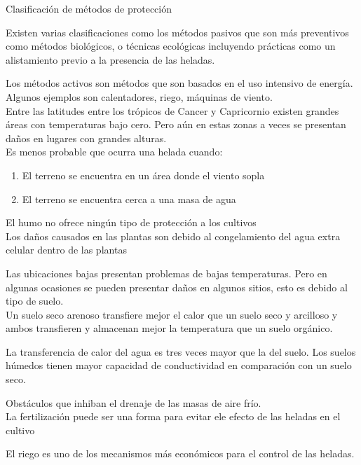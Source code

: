 \documentclass[11pt]{article}
\begin{document}
Clasificación de métodos de protección

Existen varias clasificaciones como los métodos pasivos que son más preventivos como métodos biológicos, o técnicas ecológicas incluyendo prácticas como un alistamiento previo a la presencia de las heladas.

Los métodos activos son métodos que son basados en el uso intensivo de energía. Algunos ejemplos son calentadores, riego, máquinas de viento.\\

Entre las latitudes entre los trópicos de Cancer y Capricornio existen grandes áreas con temperaturas bajo cero. Pero aún en estas zonas a veces se presentan daños en lugares con grandes alturas.\\

Es menos probable que ocurra una helada cuando:
\begin{enumerate}
\item El terreno se encuentra en un área donde el viento sopla
\item El terreno se encuentra cerca a una masa de agua
\end{enumerate}

El humo no ofrece ningún tipo de protección a los cultivos \citep{itier1987influence}\\

Los daños causados en las plantas son debido al congelamiento del agua extra celular dentro de las plantas 

Las ubicaciones bajas presentan problemas de bajas temperaturas. Pero en algunas ocasiones se pueden presentar daños en algunos sitios, esto es debido al tipo de suelo.\\

Un suelo seco arenoso transfiere mejor el calor que un suelo seco y arcilloso y ambos transfieren y almacenan mejor la temperatura que un suelo orgánico.

La transferencia de calor del agua es tres veces mayor que la del suelo. Los suelos húmedos tienen mayor capacidad de conductividad en comparación con un suelo seco.

Obstáculos que inhiban el drenaje de las masas de aire frío.\\

La fertilización puede ser una forma para evitar ele efecto de las heladas en el cultivo

El riego es uno de los mecanismos más económicos para el control de las heladas.\\
\end{document}
